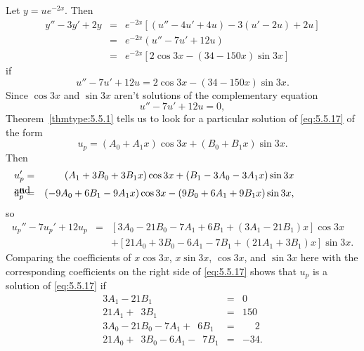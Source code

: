 \begin{examplesolution}
\solution Let $y=ue^{-2x}$. Then
\begin{eqnarray*}
  y''-3y'+2y & = & e^{-2x}\left[(u''-4u'+4u)-3(u'-2u)+2u\right] \\
             & = & e^{-2x}(u''-7u'+12u)                         \\
             & = & e^{-2x}\left[2\cos3x-(34-150x)\sin3x\right]
\end{eqnarray*}
if
\begin{equation}
  \label{eq:5.5.17}u''-7u'+12u=2\cos3x-(34-150x)\sin3x.
\end{equation}
Since $\cos3x$ and $\sin3x$ aren't solutions of the complementary equation
\[
  u''-7u'+12u=0,
\]
Theorem~\ref{thmtype:5.5.1} tells us to look for a particular solution of \eqref{eq:5.5.17} of the
form
\begin{equation}
  \label{eq:5.5.18}u_{p}=(A_{0}+A_{1}x)\cos3x+(B_{0}+B_{1}x)\sin3x.
\end{equation}
Then
\begin{eqnarray*}
  u_{p}'                 & = & (A_{1}+3B_{0}+3B_{1}x)\cos3x+(B_{1}-3A_{0}-3A_{1}x)\sin3x \\
  \arraytext{and}u_{p}'' & = & (-9A_{0}+6B_{1}-9A_{1}x)\cos3x-(9B_{0}+6A_{1}+9B_{1}x)\sin3x,
\end{eqnarray*}
so
\begin{eqnarray*}
  u_{p}''-7u_{p}'+12u_{p} & = & \left[3A_{0}-21B_{0}-7A_{1}+6B_{1}+(3A_{1}-21B_{1})x\right]\cos3x \\
                          &   & +\left[21A_{0}+3B_{0}-6A_{1}-7B_{1}+(21A_{1}+3B_{1})x\right]\sin3x.
\end{eqnarray*}
Comparing the coefficients of $x\cos3x$, $x\sin3x$, $\cos3x$, and $\sin3x$ here with the
corresponding coefficients on the right side of \eqref{eq:5.5.17} shows that $u_{p}$ is a solution
of \eqref{eq:5.5.17} if
\begin{equation}
  \label{eq:5.5.19}
  \begin{array}{rcr}
    3A_{1}-21B_{1}                                     & = & 0\phantom{.}             \\
    21A_{1}+\phantom{2}3B_{1}                          & = & 150\phantom{.}           \\
    3A_{0}-21B_{0}-7A_{1}+\phantom{2}6B_{1}            & = & \phantom{-3}2\phantom{.} \\
    21A_{0}+\phantom{2}3B_{0}-6A_{1}-\phantom{5}7B_{1} & = & -34.
  \end{array}

\end{equation}
\end{examplesolution}
